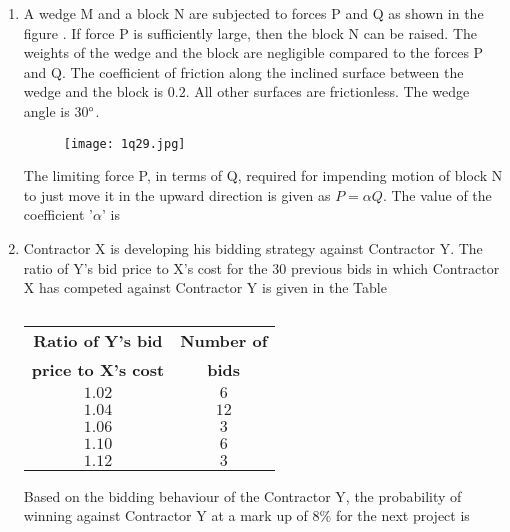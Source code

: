 \documentclass[journal,12pt,onecolumn]{article}
\theoremstyle{remark}
\begin{document}
\begin{enumerate}
\hfill{}
\begin{enumerate}
\end{enumerate}

\item A wedge M and a block N are subjected to forces P and Q as shown in the figure . If force P is sufficiently large, then the block N can be raised. The weights of the wedge and the block are negligible compared to the forces P and Q. The coefficient of friction \brak{\mu} along the inclined surface between the wedge and the block is $0.2$. All other surfaces are frictionless. The wedge angle is 30$\degree$.
\begin{figure}[H]
    \centering
    \texttt{[image: 1q29.jpg]}
    \caption{}
    \label{fig:q29}
\end{figure}
The limiting force P, in terms of Q, required for impending motion of block N to just move it in the upward direction is given as $P = \alpha Q$. The value of the coefficient '$\alpha$'  is

\hfill{}
\begin{enumerate}
\end{enumerate}

\item Contractor X is developing his bidding strategy against Contractor Y. The ratio of Y's bid price to X's cost for the 30 previous bids in which Contractor X has competed against Contractor Y is given in the Table
\begin{table}[H]
    \centering
    \begin{tabular}{|c|c|}
    \hline
    \textbf{Ratio of Y's bid} & \textbf{Number of} \\
    \textbf{price to X's cost} & \textbf{bids} \\
    \hline
    $1.02$ & $6$ \\
    \hline
    $1.04$ & $12$ \\
    \hline
    $1.06$ & $3$ \\
    \hline
    $1.10$ & $6$ \\
    \hline
    $1.12$ & $3$ \\
    \hline
    \end{tabular}
    \caption{}
    \label{tab:q30}
\end{table}
Based on the bidding behaviour of the Contractor Y, the probability of winning against Contractor Y at a mark up of $8\%$ for the next project is


\end{enumerate}
\end{document}
